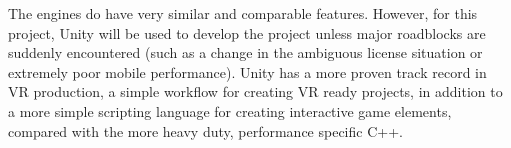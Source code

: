 \documentclass[11pt]{report}
\begin{document}
The engines do have very similar and comparable features. However, for this project, Unity will be used to develop the project unless major roadblocks are suddenly encountered (such as a change in the ambiguous license situation or extremely poor mobile performance). Unity has a more proven track record in VR production, a simple workflow for creating VR ready projects, in addition to a more simple scripting language for creating interactive game elements, compared with the more heavy duty, performance specific C++.
\end{document}
